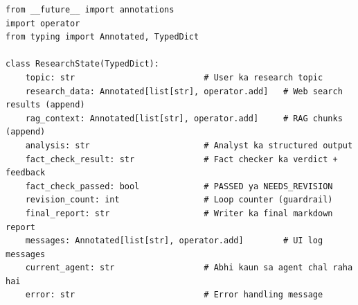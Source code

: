 \documentclass[11pt, a4paper]{article}
\begin{document}
\begin{lstlisting}[style=pythonstyle, caption={state/schema.py --- Poora Code}]
from __future__ import annotations
import operator
from typing import Annotated, TypedDict

class ResearchState(TypedDict):
    topic: str                          # User ka research topic
    research_data: Annotated[list[str], operator.add]   # Web search results (append)
    rag_context: Annotated[list[str], operator.add]     # RAG chunks (append)
    analysis: str                       # Analyst ka structured output
    fact_check_result: str              # Fact checker ka verdict + feedback
    fact_check_passed: bool             # PASSED ya NEEDS_REVISION
    revision_count: int                 # Loop counter (guardrail)
    final_report: str                   # Writer ka final markdown report
    messages: Annotated[list[str], operator.add]        # UI log messages
    current_agent: str                  # Abhi kaun sa agent chal raha hai
    error: str                          # Error handling message
\end{lstlisting}
\end{document}
